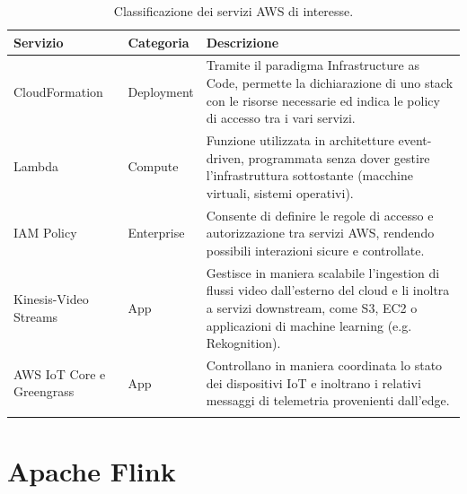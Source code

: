 \begin{longtable}{@{}p{3cm}p{2.5cm}p{7cm}@{}}
\toprule
\textbf{Servizio} & \textbf{Categoria} & \textbf{Descrizione} \\ \midrule
\endfirsthead

\endhead

CloudFormation & Deployment & Tramite il paradigma Infrastructure as Code, permette la dichiarazione di uno stack con le risorse necessarie ed indica le policy di accesso tra i vari servizi. \\ \midrule
Lambda & Compute & Funzione utilizzata in architetture event-driven, programmata senza dover gestire l'infrastruttura sottostante (macchine virtuali, sistemi operativi). \\ \midrule
IAM Policy & Enterprise & Consente di definire le regole di accesso e autorizzazione tra servizi AWS, rendendo possibili interazioni sicure e controllate. \\ \midrule
Kinesis-Video Streams & App & Gestisce in maniera scalabile l'ingestion di flussi video dall'esterno del cloud e li inoltra a servizi downstream, come S3, EC2 o applicazioni di machine learning (e.g. Rekognition). \\ \midrule
AWS IoT Core e Greengrass & App & Controllano in maniera coordinata lo stato dei dispositivi IoT e inoltrano i relativi messaggi di telemetria provenienti dall'edge. \\ \bottomrule
\caption{Classificazione dei servizi AWS di interesse.} \label{tab:aws_services}
\end{longtable}


\section{Apache Flink}



